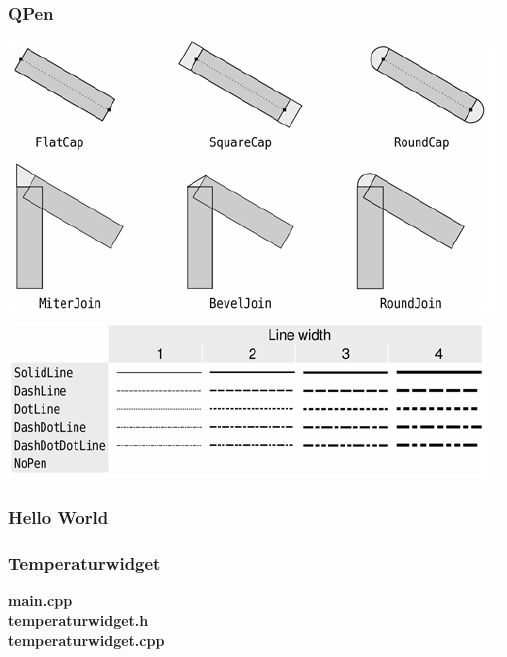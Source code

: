     \begin{minipage}{0.6\linewidth}
        \subsubsection{QPen}
        \includegraphics[width=\linewidth]{images/pen_1.png}\newline \includegraphics[width=\linewidth]{images/pen_2.png}\newline   
    \end{minipage}
\clearpage

\subsubsection{Hello World}


\subsubsection{Temperaturwidget}
\textbf{main.cpp}
\\

\textbf{temperaturwidget.h}
\\

\newpage
\textbf{temperaturwidget.cpp}
